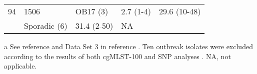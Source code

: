 \begin{table}[h!]
{\begin{threeparttable}[b]
\begin{tabular}{@{}lllll@{}}
        94 & 1506 & OB17 (3) & 2.7 (1-4) & 29.6 (10-48) \\
        ~ & Sporadic (6) & 31.4 (2-50) & NA & ~ \\
        \bottomrule
    \end{tabular}
    \begin{tablenotes}
       \item [a] {\footnotesize See reference \cite{coelho_genomic_2019} and Data Set 3 in reference \cite{friaes_supplemental_2023}. Ten outbreak isolates were excluded according to the results of both cgMLST-100 and SNP analyses \cite{coelho_genomic_2019}. NA, not applicable.}
    \end{tablenotes}
    \end{threeparttable}
    }
\end{table}